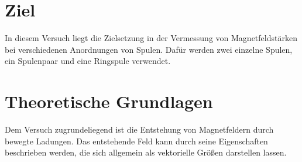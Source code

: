 \documentclass[11pt]{article}
\begin{document}
\section{Ziel}
In diesem Versuch liegt die Zielsetzung in der Vermessung von Magnetfeldstärken bei verschiedenen Anordnungen von Spulen.
Dafür werden zwei einzelne Spulen, ein Spulenpaar und eine Ringspule verwendet.

\section{Theoretische Grundlagen}
Dem Versuch zugrundeliegend ist die Entstehung von Magnetfeldern durch bewegte Ladungen.
Das entstehende Feld kann durch seine Eigenschaften beschrieben werden, die sich allgemein als vektorielle Größen
darstellen lassen.
\end{document}
